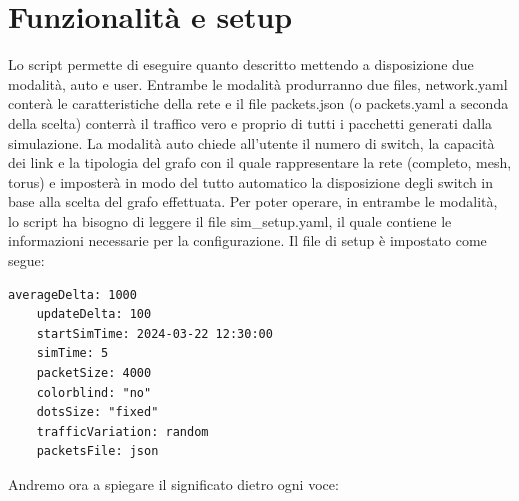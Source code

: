 \documentclass[binding=0.6cm]{sapthesis}
\begin{document}
\section{Funzionalità e setup} 
Lo script permette di eseguire quanto descritto mettendo a
 disposizione due modalità, auto e user. Entrambe le modalità produrranno due files, 
 network.yaml conterà le caratteristiche della rete e il file packets.json (o packets.yaml
 a seconda della scelta) conterrà il traffico vero e proprio di tutti i pacchetti generati 
 dalla simulazione. La modalità auto chiede all'utente il numero di switch, la capacità dei
  link e la tipologia del grafo con il quale rappresentare la rete (completo, mesh, torus) e
   imposterà in modo del tutto automatico
   la disposizione degli switch in base alla scelta del grafo effettuata. Per poter operare,
    in entrambe le modalità, lo script ha bisogno di leggere il file sim\_setup.yaml, il quale contiene le informazioni necessarie per la configurazione. 
    Il file di setup è impostato come segue:
{\scriptsize %
\begin{lstlisting}[caption={esempio di setup file}, label={codice:sim_setup_example}]
    averageDelta: 1000
    updateDelta: 100
    startSimTime: 2024-03-22 12:30:00
    simTime: 5
    packetSize: 4000
    colorblind: "no"
    dotsSize: "fixed"
    trafficVariation: random
    packetsFile: json
\end{lstlisting}
}
Andremo ora a spiegare il significato dietro ogni voce:
\end{document}
